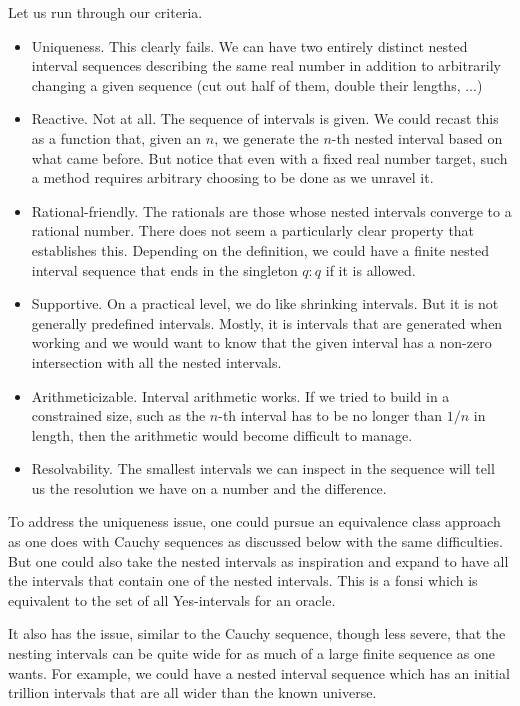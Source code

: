 \documentclass[12pt]{article}
\theoremstyle{remark}
\begin{document}
Let us run through our criteria. 

\begin{itemize}
    \item Uniqueness. This clearly fails. We can have two entirely distinct nested interval sequences describing the same real number in addition to arbitrarily changing a given sequence (cut out half of them, double their lengths, ...)
    \item Reactive. Not at all. The sequence of intervals is given. We could recast this as a function that, given an $n$, we generate the $n$-th nested interval based on what came before. But notice that even with a fixed real number target, such a method requires arbitrary choosing to be done as we unravel it.
    \item Rational-friendly. The rationals are those whose nested intervals converge to a rational number. There does not seem a particularly clear property that establishes this. Depending on the definition, we could have a finite nested interval sequence that ends in the singleton $q:q$ if it is allowed. 
    \item Supportive. On a practical level, we do like shrinking intervals. But it is not generally predefined intervals. Mostly, it is intervals that are generated when working and we would want to know that the given interval has a non-zero intersection with all the nested intervals. 
    \item Arithmeticizable. Interval arithmetic works. If we tried to build in a constrained size, such as the $n$-th interval has to be no longer than $1/n$ in length, then the arithmetic would become difficult to manage. 
    \item Resolvability. The smallest intervals we can inspect in the sequence will tell us the resolution we have on a number and the difference. 
\end{itemize}

To address the uniqueness issue, one could pursue an equivalence class approach as one does with Cauchy sequences as discussed below with the same difficulties. But one could also take the nested intervals as inspiration and expand to have all the intervals that contain one of the nested intervals. This is a fonsi which is equivalent to the set of all Yes-intervals for an oracle. 

It also has the issue, similar to the Cauchy sequence, though less severe, that the nesting intervals can be quite wide for as much of a large finite sequence as one wants. For example, we could have a nested interval sequence which has an initial trillion intervals that are all wider than the known universe. 
\end{document}
